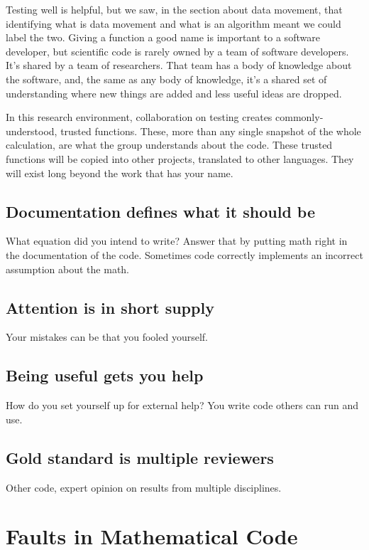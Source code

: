 \documentclass[fleqn,10pt]{olplainarticle}
\begin{document}
Testing well is helpful, but we saw, in the section about
data movement, that identifying what is data movement
and what is an algorithm meant we could label the two.
Giving a function a good name is important to a software
developer, but scientific code is rarely owned by a team
of software developers. It's shared by a team of researchers.
That team has a body of knowledge about the software, and,
the same as any body of knowledge, it's a shared set of
understanding where new things are added and less useful
ideas are dropped.

In this research environment, collaboration on testing
creates commonly-understood, trusted functions. These, more
than any single snapshot of the whole calculation, are
what the group understands about the code. These trusted
functions will be copied into other projects, translated
to other languages. They will exist long beyond the work
that has your name.


\subsection{Documentation defines what it should be}
What equation did you intend to write? Answer that by putting math right in
the documentation of the code. Sometimes code correctly implements an incorrect
assumption about the math.

\subsection{Attention is in short supply}
Your mistakes can be that you fooled yourself.

\subsection{Being useful gets you help}
How do you set yourself up for external help? You write code others can run and use.

\subsection{Gold standard is multiple reviewers}
Other code, expert opinion on results from multiple disciplines.


\appendix

\section{Faults in Mathematical Code}\label{sec:faults-and-failures}
\end{document}
